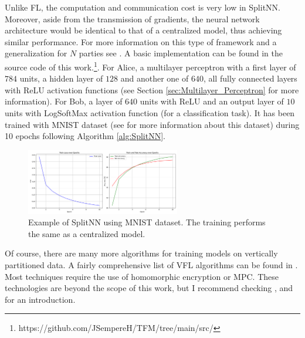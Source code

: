 Unlike FL, the computation and communication cost is very low in SplitNN. Moreover, aside from the transmission of gradients, the neural network architecture would be identical to that of a centralized model, thus achieving similar performance. For more information on this type of framework and a generalization for $N$ parties see \cite{gupta2018}.
A basic implementation can be found in the source code of this work.\footnote{https://github.com/JSempereH/TFM/tree/main/src/}. For Alice, a multilayer perceptron with a first layer of $784$ units, a hidden layer of $128$ and another one of $640$, all fully connected layers with ReLU activation functions (see Section \ref{sec:Multilayer_Perceptron} for more information). For Bob, a layer of $640$ units with ReLU and an output layer of $10$ units with LogSoftMax activation function (for a classification task). It has been trained with MNIST dataset (see \cite{deng2012} for more information about this dataset) during 10 epochs following Algorithm \ref{alg:SplitNN}.
\begin{figure}[H]
  \centering
  \includegraphics[width=0.6\textwidth]{figures/3-Vertical_Machine_Learning/MNIST_metrics_SplitNN.png}
  \caption{Example of SplitNN using MNIST dataset. The training performs the same as a centralized model.}
  \label{fig:MNIST_SplitNN_Metrics}
\end{figure}

Of course, there are many more algorithms for training models on vertically partitioned data.
A fairly comprehensive list of VFL algorithms can be found in \cite{yang2023}. Most techniques require the use of homomorphic encryption or MPC. These technologies are beyond the scope of this work, but I recommend checking \cite{gentry}, \cite{escudero2022} and \cite{evans} for an introduction.
